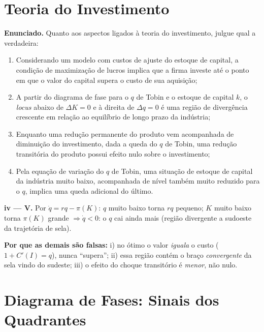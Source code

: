 \documentclass[12pt, a4paper]{article}
\begin{document}
\section{Teoria do Investimento}

\textbf{Enunciado.} Quanto aos aspectos ligados à teoria do investimento,
julgue qual a verdadeira:

\begin{enumerate}[label=\roman*)]
\item Considerando um modelo com custos de ajuste do estoque de capital, a
condição de maximização de lucros implica que a firma investe até o ponto em
que o valor do capital supera o custo de sua aquisição;
\item A partir do diagrama de fase para o $q$ de Tobin e o estoque de capital
$k$, o \emph{locus} abaixo de $\Delta K = 0$ e à direita de $\Delta q = 0$ é
uma região de divergência crescente em relação ao equilíbrio de longo prazo da
indústria;
\item Enquanto uma redução permanente do produto vem acompanhada de diminuição
do investimento, dada a queda do $q$ de Tobin, uma redução transitória do
produto possui efeito nulo sobre o investimento;
\item Pela equação de variação do $q$ de Tobin, uma situação de estoque de
capital da indústria muito baixo, acompanhada de nível também muito reduzido
para o $q$, implica uma queda adicional do último.
\end{enumerate}

\begin{correctbox}[title={Resposta: iv) --- reciclada: gabarito oficial P2 2021 (Q2) e P2 2024 (Q3)}]
\textbf{iv --- V.} Por $\dot q = rq - \pi(K)$: $q$ muito baixo torna $rq$
pequeno; $K$ muito baixo torna $\pi(K)$ grande $\Rightarrow \dot q < 0$: o $q$
cai ainda mais (região divergente a sudoeste da trajetória de sela).

\textbf{Por que as demais são falsas:} i) no ótimo o valor \emph{iguala} o
custo ($1 + C'(I) = q$), nunca ``supera''; ii) essa região contém o braço
\emph{convergente} da sela vindo do sudeste; iii) o efeito do choque
transitório é \emph{menor}, não nulo.
\end{correctbox}

\section{Diagrama de Fases: Sinais dos Quadrantes}
\end{document}
